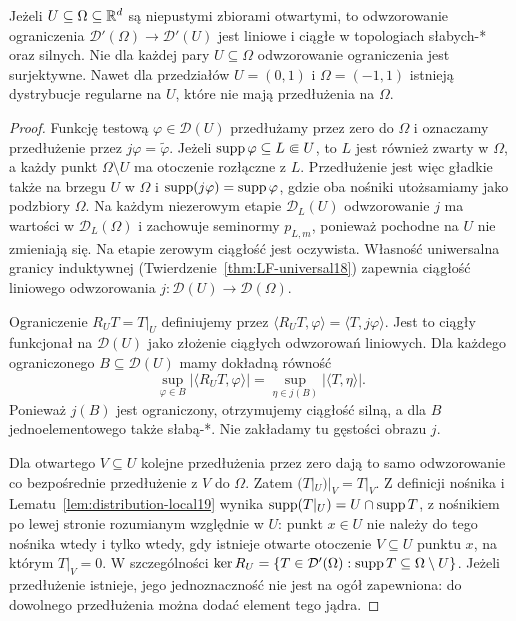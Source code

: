 \begin{twierdzenie}
\label{thm:restriction25}
Jeżeli $U\subseteq\Omega\subseteq\mathbb R^d$ są niepustymi
zbiorami otwartymi, to odwzorowanie ograniczenia
$\mathcal D'(\Omega)\to\mathcal D'(U)$ jest liniowe
i ciągłe w topologiach słabych-* oraz silnych.
Nie dla każdej pary $U\subseteq\Omega$ odwzorowanie
ograniczenia jest surjektywne. Nawet dla przedziałów
$U=(0,1)$ i $\Omega=(-1,1)$ istnieją dystrybucje
regularne na $U$, które nie mają przedłużenia na $\Omega$.
\end{twierdzenie}
\begin{proof}
Funkcję testową $\varphi\in\mathcal D(U)$ przedłużamy
przez zero do $\Omega$ i oznaczamy przedłużenie przez
$j\varphi=\widetilde\varphi$. Jeżeli
$\operatorname{supp}\varphi\subseteq L\Subset U$, to $L$ jest również
zwarty w $\Omega$, a każdy punkt $\Omega\setminus U$
ma otoczenie rozłączne z $L$. Przedłużenie jest więc
gładkie także na brzegu $U$ w $\Omega$ i
$\operatorname{supp}(j\varphi)=\operatorname{supp}\varphi$, gdzie oba nośniki
utożsamiamy jako podzbiory $\Omega$.
Na każdym niezerowym etapie $\mathcal D_L(U)$
odwzorowanie $j$ ma wartości w $\mathcal D_L(\Omega)$
i zachowuje seminormy $p_{L,m}$, ponieważ pochodne
na $U$ nie zmieniają się. Na etapie zerowym ciągłość
jest oczywista. Własność uniwersalna granicy induktywnej
(Twierdzenie~\ref{thm:LF-universal18}) zapewnia ciągłość
liniowego odwzorowania $j:\mathcal D(U)\to\mathcal D(\Omega)$.

Ograniczenie $R_U T=T|_U$ definiujemy przez
$\langle R_U T,\varphi\rangle=\langle T,j\varphi\rangle$.
Jest to ciągły funkcjonał na $\mathcal D(U)$ jako
złożenie ciągłych odwzorowań liniowych.
Dla każdego ograniczonego $B\subseteq\mathcal D(U)$
mamy dokładną równość
\[
 \sup_{\varphi\in B}|\langle R_U T,\varphi\rangle|
 =\sup_{\eta\in j(B)}|\langle T,\eta\rangle|.
\]
Ponieważ $j(B)$ jest ograniczony, otrzymujemy ciągłość
silną, a dla $B$ jednoelementowego także słabą-*.
Nie zakładamy tu gęstości obrazu $j$.

Dla otwartego $V\subseteq U$ kolejne przedłużenia przez
zero dają to samo odwzorowanie co bezpośrednie
przedłużenie z $V$ do $\Omega$. Zatem
$(T|_U)|_V=T|_V$. Z definicji nośnika i
Lematu~\ref{lem:distribution-local19} wynika
$\operatorname{supp}(T|_U)=U\cap\operatorname{supp} T$, z nośnikiem po lewej
stronie rozumianym względnie w $U$: punkt $x\in U$
nie należy do tego nośnika wtedy i tylko wtedy,
gdy istnieje otwarte otoczenie $V\subseteq U$ punktu
$x$, na którym $T|_V=0$. W szczególności
$\ker R_U=\{T\in\mathcal D'(\Omega):
\operatorname{supp} T\subseteq\Omega\setminus U\}$.
Jeżeli przedłużenie istnieje, jego jednoznaczność
nie jest na ogół zapewniona: do dowolnego przedłużenia
można dodać element tego jądra.


\end{proof}
